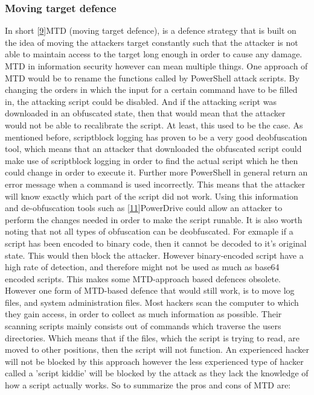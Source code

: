 \documentclass{article}%
\begin{document}
\subsubsection{Moving target defence}
In short [\hyperlink{9}{9}]MTD (moving target defence), is a defence strategy that is built on the idea of moving the attackers target constantly such that the attacker is not able to maintain access to the target long enough in order to cause any damage. MTD in information security however can mean multiple things. One approach of MTD would be to rename the functions called by PowerShell attack scripts. By changing the orders in which the input for a certain command have to be filled in, the attacking script could be disabled. And if the attacking script was downloaded in an obfuscated state, then that would mean that the attacker would not be able to recalibrate the script. At least, this used to be the case. As mentioned before, scriptblock logging has proven to be a very good deobfuscation tool, which means that an attacker that downloaded the obfuscated script could make use of scriptblock logging in order to find the actual script which he then could change in order to execute it. Further more PowerShell in general return an error message when a command is used incorrectly. This means that the attacker will know exactly which part of the script did not work. Using this information and de-obfuscation tools such as [\hyperlink{11}{11}]PowerDrive could allow an attacker to perform the changes needed in order to make the script runable. It is also worth noting that not all types of obfuscation can be deobfuscated. For exmaple if a script has been encoded to binary code, then it cannot be decoded to it's original state. This would then block the attacker. However binary-encoded script have a high rate of detection, and therefore might not be used as much as base64 encoded scripts. This makes some MTD-approach based defences obsolete. However one form of MTD-based defence that would still work, is to move log files, and system administration files. Most hackers scan the computer to which they gain access, in order to collect as much information as possible. Their scanning scripts mainly consists out of commands which traverse the users directories. Which means that if the files, which the script is trying to read, are moved to other positions, then the script will not function. An experienced hacker will not be blocked by this approach however the less experienced type of hacker called a 'script kiddie' will be blocked by the attack as they lack the knowledge of how a script actually works. So to summarize the pros and cons of MTD are:\\
\end{document}
